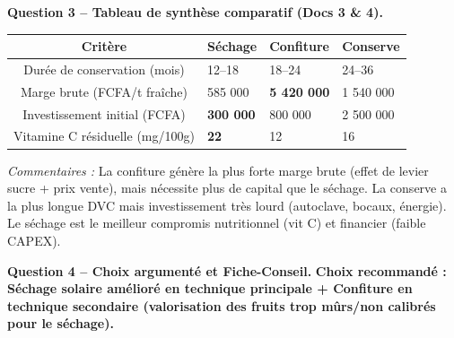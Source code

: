 \documentclass[11pt]{article}
\begin{document}
\begin{exoresolu}
\textbf{Question 3 -- Tableau de synthèse comparatif (Docs 3 \& 4).}
\begin{center}
\begin{tabularx}{\linewidth}{|c|X|X|X|}\hline
\rowcolor{popblueL}
\textbf{Critère} & \textbf{Séchage} & \textbf{Confiture} & \textbf{Conserve} \\ \hline
Durée de conservation (mois) & 12--18 & 18--24 & 24--36 \\ \hline
Marge brute (FCFA/t fraîche) & 585 000 & \textbf{5 420 000} & 1 540 000 \\ \hline
Investissement initial (FCFA) & \textbf{300 000} & 800 000 & 2 500 000 \\ \hline
Vitamine C résiduelle (mg/100g) & \textbf{22} & 12 & 16 \\ \hline
\end{tabularx}
\end{center}
\vspace{0.5em}
\noindent\textit{Commentaires :} La confiture génère la plus forte marge brute (effet de levier sucre + prix vente), mais nécessite plus de capital que le séchage. La conserve a la plus longue DVC mais investissement très lourd (autoclave, bocaux, énergie). Le séchage est le meilleur compromis nutritionnel (vit C) et financier (faible CAPEX).

\textbf{Question 4 -- Choix argumenté et Fiche-Conseil.}
\textbf{Choix recommandé : \textbf{Séchage solaire amélioré} en technique principale + \textbf{Confiture} en technique secondaire (valorisation des fruits trop mûrs/non calibrés pour le séchage).}


\end{exoresolu}
\end{document}
